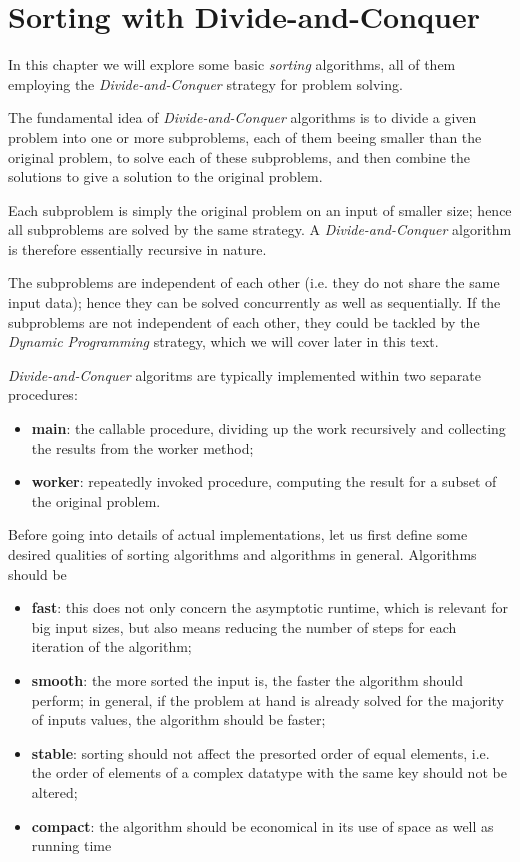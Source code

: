 \chapter{Sorting with Divide-and-Conquer}

In this chapter we will explore some basic \emph{sorting} algorithms, all of them employing the \emph{Divide-and-Conquer} strategy for problem solving.

The fundamental idea of \emph{Divide-and-Conquer} algorithms is to divide a given problem into one or more subproblems, each of them beeing smaller than the original problem, to solve each of these subproblems, and then combine the solutions to give a solution to the original problem.

Each subproblem is simply the original problem on an input of smaller size; hence all subproblems are solved by the same strategy. A \emph{Divide-and-Conquer} algorithm is therefore essentially recursive in nature.

The subproblems are independent of each other (i.e. they do not share the same input data); hence they can be solved concurrently as well as sequentially. If the subproblems are not independent of each other, they could be tackled by the \emph{Dynamic Programming} strategy, which we will cover later in this text.

\emph{Divide-and-Conquer} algoritms are typically implemented within two separate procedures:
\begin{itemize}
\item \textbf{main}: the callable procedure, dividing up the work recursively and collecting the results from the worker method;
\item \textbf{worker}: repeatedly invoked procedure, computing the result for a subset of the original problem.
\end{itemize}

Before going into details of actual implementations, let us first define some desired qualities of sorting algorithms and algorithms in general.
Algorithms should be
\begin{itemize}
\item \textbf{fast}: this does not only concern the asymptotic runtime, which is relevant for big input sizes, but also means reducing the number of steps for each iteration of the algorithm; 
\item \textbf{smooth}: the more sorted the input is, the faster the algorithm should perform; in general, if the problem at hand is already solved for the majority of inputs values, the algorithm should be faster;
\item \textbf{stable}: sorting should not affect the presorted order of equal elements, i.e. the order of elements of a complex datatype with the same key should not be altered;
\item \textbf{compact}: the algorithm should be economical in its use of space as well as running time
\end{itemize}

